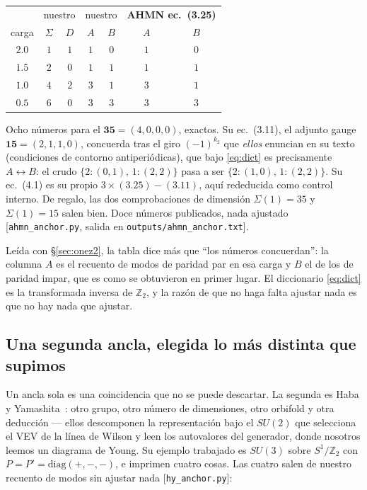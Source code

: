 \documentclass[11pt,a4paper]{article}
\newcommand{\ZZ}{\mathbb{Z}}
\newcommand{\su}[1]{SU(#1)}
\begin{document}
\begin{center}\small
{}
\begin{tabular}{c cc cc cc}
\toprule
\rowcolor{hdrblue!14}
& \multicolumn{2}{c}{nuestro} & \multicolumn{2}{c}{nuestro} &
\multicolumn{2}{c}{\textbf{AHMN ec.~(3.25)}}\\
\rowcolor{hdrblue!14}
carga & $\Sigma$ & $D$ & $A$ & $B$ & $A$ & $B$\\
\midrule
$2.0$ & $1$ & $1$ & $1$ & $0$ & $1$ & $0$\\
$1.5$ & $2$ & $0$ & $1$ & $1$ & $1$ & $1$\\
$1.0$ & $4$ & $2$ & $3$ & $1$ & $3$ & $1$\\
$0.5$ & $6$ & $0$ & $3$ & $3$ & $3$ & $3$\\
\bottomrule
\end{tabular}
\end{center}

\noindent Ocho números para el $\mathbf{35}=(4,0,0,0)$, exactos. Su ec.~(3.11), el adjunto gauge
$\mathbf{15}=(2,1,1,0)$, concuerda tras el giro $(-1)^{k_2}$ que \emph{ellos} enuncian en su texto
(condiciones de contorno antiperiódicas), que bajo \eqref{eq:dict} es precisamente
$A\leftrightarrow B$: el crudo $\{2:(0,1),\,1:(2,2)\}$ pasa a ser $\{2:(1,0),\,1:(2,2)\}$. Su
ec.~(4.1) es su propio $3\times(3.25)-(3.11)$, aquí rededucida como control interno. De regalo, las
dos comprobaciones de dimensión $\Sigma(1)=35$ y $\Sigma(1)=15$ salen bien. Doce números publicados,
nada ajustado [\texttt{ahmn\_anchor.py}, salida en \texttt{outputs/ahmn\_anchor.txt}].

Leída con \S\ref{sec:onez2}, la tabla dice más que ``los números concuerdan'': la columna $A$ es el
recuento de modos de paridad par en esa carga y $B$ el de los de paridad impar, que es como se
obtuvieron en primer lugar. El diccionario \eqref{eq:dict} es la transformada inversa de $\ZZ_2$, y
la razón de que no haga falta ajustar nada es que no hay nada que ajustar.

\subsection*{Una segunda ancla, elegida lo más distinta que supimos}

Un ancla sola es una coincidencia que no se puede descartar. La segunda es Haba y Yamashita~\cite{HY}:
otro grupo, otro número de dimensiones, otro orbifold y otra deducción --- ellos descomponen la
representación bajo el $SU(2)$ que selecciona el VEV de la línea de Wilson y leen los autovalores del
generador, donde nosotros leemos un diagrama de Young. Su ejemplo trabajado es $\su3$ sobre
$S^1/\ZZ_2$ con $P=P'=\mathrm{diag}(+,-,-)$, e imprimen cuatro cosas. Las cuatro salen de nuestro
recuento de modos sin ajustar nada [\texttt{hy\_anchor.py}]:
\end{document}
